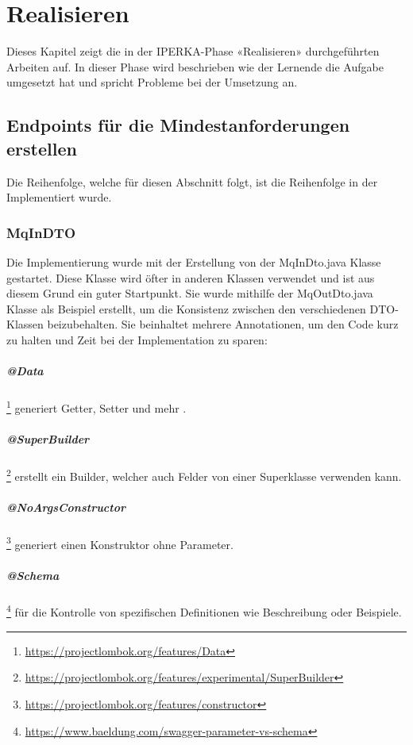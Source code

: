 \chapter{Realisieren}\label{ch:realisieren}
Dieses Kapitel zeigt die in der IPERKA-Phase «Realisieren» durchgeführten Arbeiten auf. In dieser Phase wird beschrieben wie der Lernende die Aufgabe umgesetzt hat und spricht Probleme bei der Umsetzung an.

\section{Endpoints für die Mindestanforderungen erstellen}
Die Reihenfolge, welche für diesen Abschnitt folgt, ist die Reihenfolge in der Implementiert wurde.

\subsection{MqInDTO}
Die Implementierung wurde mit der Erstellung von der MqInDto.java Klasse gestartet. Diese Klasse wird öfter in anderen Klassen verwendet und ist aus diesem Grund ein guter Startpunkt. Sie wurde mithilfe der MqOutDto.java Klasse als Beispiel erstellt, um die Konsistenz zwischen den verschiedenen DTO-Klassen beizubehalten. Sie beinhaltet mehrere Annotationen, um den Code kurz zu halten und Zeit bei der Implementation zu sparen:
\paragraph{@Data} \footnote{\url{https://projectlombok.org/features/Data}} generiert Getter, Setter und mehr .
\paragraph{@SuperBuilder} \footnote{\url{https://projectlombok.org/features/experimental/SuperBuilder}} erstellt ein Builder, welcher auch Felder von einer Superklasse verwenden kann.
\paragraph{@NoArgsConstructor} \footnote{\url{https://projectlombok.org/features/constructor}} generiert einen Konstruktor ohne Parameter.
\paragraph{@Schema} \footnote{\url{https://www.baeldung.com/swagger-parameter-vs-schema}} für die Kontrolle von spezifischen Definitionen wie Beschreibung oder Beispiele.
